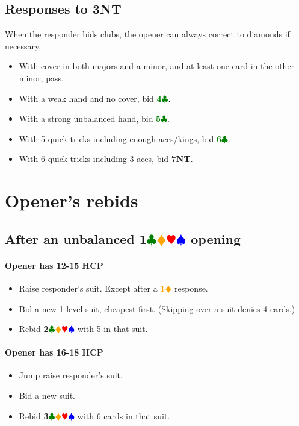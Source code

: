 \documentclass{article}
\newcommand{\Hs}{\textcolor{Red}{$\varheart$}}
\newcommand{\Ss}{\textcolor{Blue}{$\spadesuit$}}
\newcommand{\Ds}{\textcolor{Orange}{$\vardiamond$}}
\newcommand{\Cs}{\textcolor{Green}{$\clubsuit$}}
\newcommand{\NTs}{\textbf{\footnotesize{NT}}}
\newcommand{\D}[1]{\textcolor{Orange}{\textbf{#1}\Ds}}
\newcommand{\C}[1]{\textcolor{Green}{\textbf{#1}\Cs}}
\newcommand{\NT}[1]{\textbf{#1\NTs}}
\newcommand{\suits}[1]{\textbf{#1}\Cs\Ds\Hs\Ss}
\begin{document}
\subsection{Responses to \NT{3}}

When the responder bids clubs, the opener can always correct to diamonds if necessary.
\begin{itemize}
\item With cover in both majors and a minor, and at least one card in the other minor, pass.
\item With a weak hand and no cover, bid \C{4}.
\item With a strong unbalanced hand, bid \C{5}.
\item With 5 quick tricks including enough aces/kings, bid \C{6}.
\item With 6 quick tricks including 3 aces, bid \NT{7}.
\end{itemize}

\section{Opener's rebids}

\subsection{After an unbalanced \suits{1} opening}

\paragraph{Opener has 12-15 HCP}

\begin{itemize}
\item Raise responder's suit. Except after a \D{1} response.
\item Bid a new 1 level suit, cheapest first. (Skipping over a suit denies 4 cards.)
\item Rebid \suits{2} with 5 in that suit.
\end{itemize}

\paragraph{Opener has 16-18 HCP}

\begin{itemize}
\item Jump raise responder's suit.
\item Bid a new suit.
\item Rebid \suits{3} with 6 cards in that suit.
\end{itemize}
\end{document}
